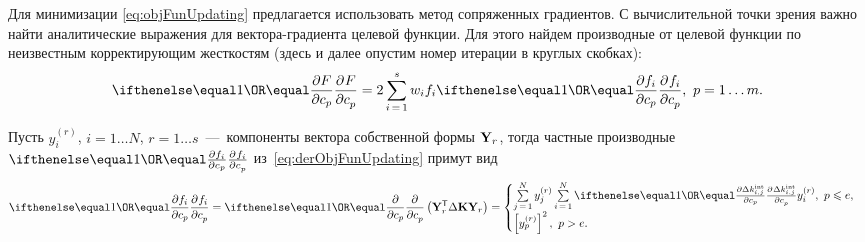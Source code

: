 Для минимизации \eqref{eq:objFunUpdating} предлагается использовать метод сопряженных градиентов. С вычислительной точки зрения важно найти аналитические выражения для вектора-градиента целевой функции. Для этого найдем производные от целевой функции по неизвестным корректирующим жесткостям (здесь и далее опустим номер итерации в круглых скобках):
\begin{equation}
	\partDer{F}{c_p}{} = 2 \sum\limits_{i\,=\,1} ^ s w_i f_i \partDer{f_i}{c_p}{}, \ p = 1 \hdots m.
	\label{eq:derObjFunUpdating}
\end{equation}

Пусть $ y_i ^ {(r)} $, $ i = 1 \hdots N $, $ r = 1 \hdots s $~---~компоненты вектора собственной формы $ \mathbf{Y}_r $, тогда частные производные $ \partDer{f_i}{c_p}{} $ из~\eqref{eq:derObjFunUpdating} примут вид
\begin{equation}
	\partDer{f_i}{c_p}{} = \partDer{}{c_p}{} \rbrackets{\trans{\mat{Y}_r} \Delta \mat{K} \mat{Y}_r} =
	\begin{cases}
		\sum\limits_{j\,=\,1} ^ N y_j ^ {(r)} \sum \limits_{i\,=\,1} ^ N \partDer{\Delta \internal{k}_{i, j}}{c_p}{} y_i ^{(r)},\ p \leq e, \\
		\sbrackets{y_p ^ {(r)}} ^ 2,\ p > e.
	\end{cases}
	\label{eq:derResidualUpdating}
\end{equation}

